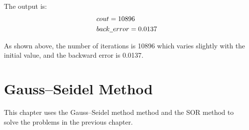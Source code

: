 \documentclass[UTF8]{ctexart}
\begin{document}
The output is:
\begin{align*}
\begin{split}
&cout =10896\\
&back \underline{\hspace{0.5em}}error =0.0137
\end{split}
\end{align*}

As shown above, the number of iterations is 10896 which varies slightly with the initial value, and the backward error is 0.0137.
\section{Gauss–Seidel  Method}
   This chapter uses the Gauss–Seidel method method and the SOR method to solve the problems in the previous chapter.
   
\end{document}
